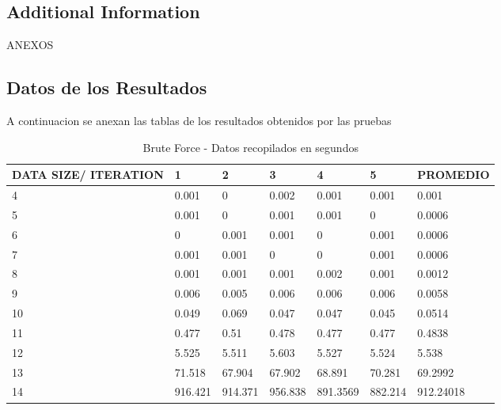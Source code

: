 \documentclass[12pt]{article}
\begin{document}
\begin{appendices}

\section{Additional Information}
ANEXOS

\subsection{Datos de los Resultados}
A continuacion se anexan las tablas de los resultados obtenidos por las pruebas

\begin{table}[!ht]
    \centering
    \caption{Brute Force - Datos recopilados en segundos}
    \begin{tabular}{|l|l|l|l|l|l|l|}
    \hline
        DATA SIZE/ ITERATION & 1 & 2 & 3 & 4 & 5 & PROMEDIO \\ \hline
        4 & 0.001 & 0 & 0.002 & 0.001 & 0.001 & 0.001 \\ \hline
        5 & 0.001 & 0 & 0.001 & 0.001 & 0 & 0.0006 \\ \hline
        6 & 0 & 0.001 & 0.001 & 0 & 0.001 & 0.0006 \\ \hline
        7 & 0.001 & 0.001 & 0 & 0 & 0.001 & 0.0006 \\ \hline
        8 & 0.001 & 0.001 & 0.001 & 0.002 & 0.001 & 0.0012 \\ \hline
        9 & 0.006 & 0.005 & 0.006 & 0.006 & 0.006 & 0.0058 \\ \hline
        10 & 0.049 & 0.069 & 0.047 & 0.047 & 0.045 & 0.0514 \\ \hline
        11 & 0.477 & 0.51 & 0.478 & 0.477 & 0.477 & 0.4838 \\ \hline
        12 & 5.525 & 5.511 & 5.603 & 5.527 & 5.524 & 5.538 \\ \hline
        13 & 71.518 & 67.904 & 67.902 & 68.891 & 70.281 & 69.2992 \\ \hline
        14 & 916.421 & 914.371 & 956.838 & 891.3569 & 882.214 & 912.24018 \\ \hline
    \end{tabular}
\end{table}



\end{appendices}
\end{document}
